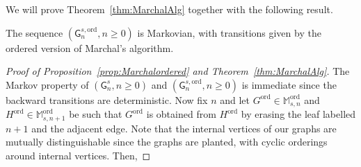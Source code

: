 \documentclass[AHL,Unicode,longabstracts,published]{cedram}
\newcommand{\ord}{\mathrm{ord}}
\newcommand{\sG}{\mathsf{G}}
\newcommand{\M}{\mathbb{M}}
\begin{document}
We will prove Theorem~\ref{thm:MarchalAlg} together with the following result.

\begin{prop}\label{prop:Marchalordered}
The sequence $(\sG^{s,\ord}_{n}, n\geq 0)$ is Markovian, with transitions given by the ordered version of Marchal's algorithm.
\end{prop}

\begin{proof}[Proof of Proposition~\ref{prop:Marchalordered} and Theorem~\ref{thm:MarchalAlg}]
The Markov property of $(\sG^s_n,n \geq 0)$ and $(\sG^{s,\ord}_{n},n \geq 0)$ is immediate since the backward transitions are deterministic. Now fix $n$ and let $G^{\ord} \in \M^{\ord}_{s,n}$ and $H^{\ord} \in \M^{\ord}_{s,n+1}$ be such that $G^{\ord}$ is obtained from $H^{\ord}$ by erasing the leaf labelled $n+1$ and the adjacent edge. Note that the internal vertices of our graphs are mutually distinguishable since the graphs are planted, with cyclic orderings around internal vertices. Then,


\end{proof}
\end{document}
